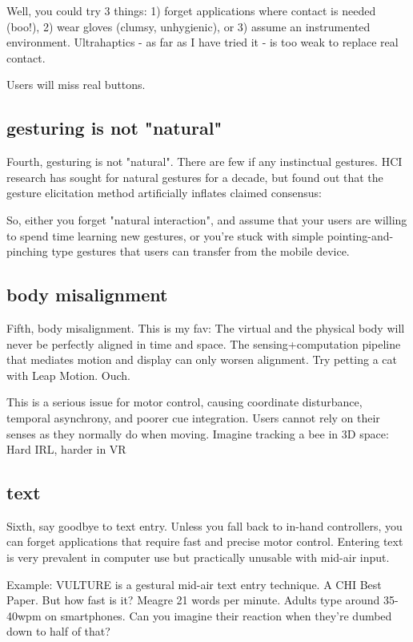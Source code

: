 Well, you could try 3 things: 1) forget applications where contact is needed (boo!), 2) wear gloves (clumsy, unhygienic), or 3) assume an instrumented environment. Ultrahaptics - as far as I have tried it - is too weak to replace real contact. 

Users will miss real buttons. 


\subsection{gesturing is not "natural"}
Fourth, gesturing is not "natural". There are few if any instinctual gestures. HCI research has sought for natural gestures for a decade, but found out that the gesture elicitation method artificially inflates claimed consensus: 

So, either you forget "natural interaction", and assume that your users are willing to spend time learning new gestures, or you're stuck with simple pointing-and-pinching type gestures that users can transfer from the mobile device.



\subsection{body misalignment}
Fifth, body misalignment. This is my fav: The virtual and the physical body will never be perfectly aligned in time and space. The sensing+computation pipeline that mediates motion and display can only worsen alignment. Try petting a cat with Leap Motion. Ouch.

This is a serious issue for motor control, causing coordinate disturbance, temporal asynchrony, and poorer cue integration. Users cannot rely on their senses as they normally do when moving. Imagine tracking a bee in 3D space: Hard IRL, harder in VR


\subsection{text}
Sixth, say goodbye to text entry. Unless you fall back to in-hand controllers, you can forget applications that require fast and precise motor control. Entering text is very prevalent in computer use but practically unusable with mid-air input. 



Example: VULTURE is a gestural mid-air text entry technique. A CHI Best Paper. But how fast is it? Meagre 21 words per minute.  Adults type around 35-40wpm on smartphones. Can you imagine their reaction when they're dumbed down to half of that?

